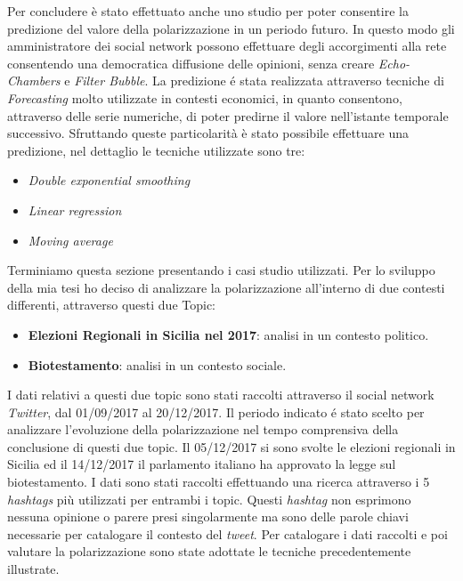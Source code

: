 Per concludere è stato effettuato anche uno studio per poter consentire la predizione del valore della polarizzazione in un periodo futuro. In questo modo gli amministratore dei social network possono effettuare degli accorgimenti alla rete consentendo una democratica diffusione delle opinioni, senza creare \textit{Echo-Chambers} e \textit{Filter Bubble}.  
La predizione \'e stata realizzata attraverso tecniche di \textit{Forecasting} molto utilizzate in contesti economici, in quanto consentono, attraverso delle serie numeriche, di poter predirne il valore nell'istante temporale successivo. Sfruttando queste particolarità è stato possibile effettuare una predizione, nel dettaglio le tecniche utilizzate sono tre:
\begin{itemize}
\item \textit{Double exponential smoothing}
\item \textit{Linear regression}
\item \textit{Moving average}
\end{itemize}


Terminiamo questa sezione presentando i casi studio utilizzati. Per lo sviluppo della mia tesi ho deciso di analizzare  la polarizzazione all'interno di due contesti differenti, attraverso questi due Topic:
\begin{itemize}
\item \textbf{Elezioni Regionali in Sicilia nel 2017}: analisi in un contesto politico.
\item \textbf{Biotestamento}: analisi in un contesto sociale.
\end{itemize}
I dati relativi a questi due topic sono stati raccolti attraverso il social network \textit{Twitter}, dal 01/09/2017 al 20/12/2017. Il periodo indicato \'e stato scelto per analizzare l'evoluzione della polarizzazione nel tempo comprensiva della conclusione di questi due topic.
Il 05/12/2017 si sono svolte le elezioni regionali in Sicilia ed il 14/12/2017 il parlamento italiano ha approvato la legge sul biotestamento.
I dati sono stati raccolti effettuando una ricerca attraverso i 5 \textit{hashtags} più utilizzati per entrambi i topic. Questi \textit{hashtag} non esprimono nessuna opinione o parere presi singolarmente ma sono delle parole chiavi necessarie per catalogare il contesto del \textit{tweet}. Per catalogare i dati raccolti e poi valutare la polarizzazione sono state adottate le tecniche precedentemente illustrate.

